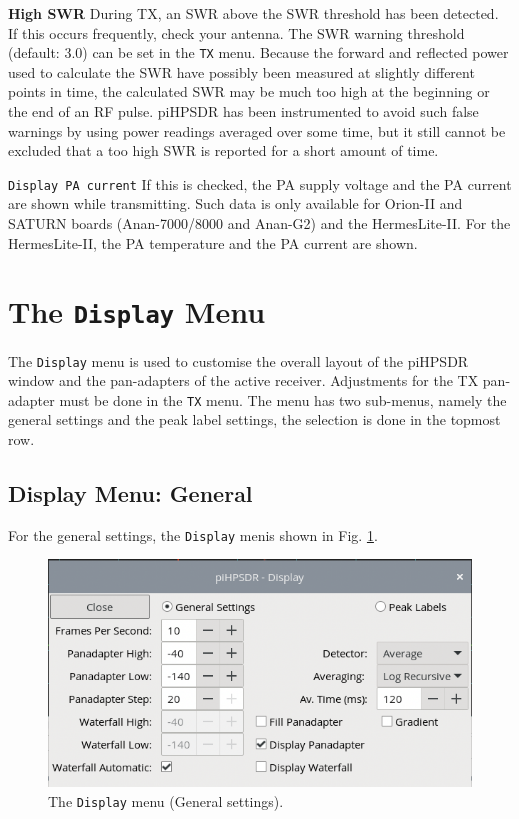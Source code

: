 \documentclass[12pt]{book}
\def\rett#1{\texttt{\color{red}#1}}
\def\bltt#1{\texttt{\color{blue}#1}}
\def\pH{pi\-HPSDR\xspace}
\begin{document}
\textbf{High SWR} During TX, an SWR above the SWR threshold has been detected. If this occurs
frequently, check your antenna. The SWR warning threshold (default: 3.0) can be set in the
\bltt{TX} menu. Because the forward and reflected power used to calculate the SWR have
possibly been measured at slightly different points in time, the calculated SWR may be
much too high at the beginning or the end of an RF pulse. \pH has been instrumented to
avoid such false warnings by using power readings averaged over some time, but it still
cannot be excluded that a too high SWR is reported for a short amount of time.

\rett{Display PA current} If this is checked, the PA supply voltage and the PA current
are shown while transmitting. Such data is only available for Orion-II and SATURN boards
(Anan-7000/8000 and Anan-G2) and the HermesLite-II.
For the HermesLite-II, the PA temperature and the PA current are shown.
\section{The \texttt{Display} Menu}

The \bltt{Display} menu is used to customise the overall layout of the \pH
window and the pan-adapters of the active receiver. Adjustments
for the TX pan-adapter must be done in the \bltt{TX} menu. The menu has two sub-menus,
namely the general settings and the peak label settings, the selection is done
in the topmost row.

\subsection{Display Menu: General}

For the general settings, the \bltt{Display} menis shown
in Fig. \ref{fig:DisplayMenuGeneral}.

\begin{figure}[ht]
\center
\includegraphics[scale=0.45]{DisplayMenuGeneral.png}
\caption{The \bltt{Display} menu (General settings).}
\label{fig:DisplayMenuGeneral}
\end{figure}
\end{document}
